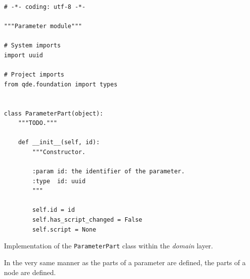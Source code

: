 \documentclass[10pt, openright, notitlepage]{scrreprt}
\begin{document}
\begin{listing}[H]
\begin{verbatim}
# -*- coding: utf-8 -*-

"""Parameter module"""

# System imports
import uuid

# Project imports
from qde.foundation import types


class ParameterPart(object):
    """TODO."""

    def __init__(self, id):
        """Constructor.

        :param id: the identifier of the parameter.
        :type  id: uuid
        """

        self.id = id
        self.has_script_changed = False
        self.script = None
\end{verbatim}
\caption{\label{lst:domain-parameter-parameterpart}
Implementation of the \texttt{ParameterPart} class within the \emph{domain} layer.}
\end{listing}

In the very same manner as the parts of a parameter are defined, the parts of a
node are defined.
\end{document}
